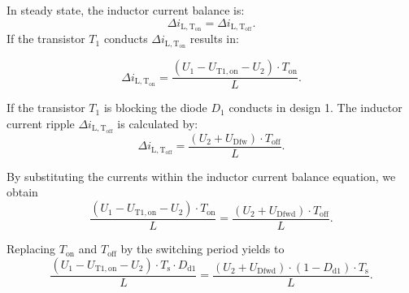 

\begin{solutionblock}
	In steady state, the inductor current balance is:
	\begin{equation*}
		\Delta i_\mathrm{L,T_\mathrm{on}} =\Delta i_\mathrm{L,T_\mathrm{off}} .
	\end{equation*}
	If the transistor $T_\mathrm{1}$ conducts $\Delta i_\mathrm{L,T_\mathrm{on}}$ results in:

	\begin{equation*}
		\Delta i_\mathrm{L,T_\mathrm{on}}=\frac{(U_\mathrm{1}-U_\mathrm{T1,on}-U_\mathrm{2}) \cdot T_\mathrm{on} }{L}.
	\end{equation*}

	If the transistor $T_\mathrm{1}$ is blocking the diode $D_\mathrm{1}$ conducts in design 1.
	The inductor current ripple $\Delta i_\mathrm{L,T_\mathrm{off}}$ is calculated by:
	\begin{equation*}
		\Delta i_\mathrm{L,T_\mathrm{off}}=\frac{(U_\mathrm{2}+U_\mathrm{Dfw}) \cdot T_\mathrm{off}}{L}.
	\end{equation*}

	By substituting the currents within the inductor current balance equation, we obtain
	\begin{equation*}
		\frac{(U_\mathrm{1}-U_\mathrm{T1,on}-U_\mathrm{2}) \cdot T_\mathrm{on}}{L}=\frac{(U_\mathrm{2}+U_\mathrm{Dfwd}) \cdot T_\mathrm{off}}{L}.
	\end{equation*}

	Replacing $T_\mathrm{on}$ and $T_\mathrm{off}$ by the switching period yields to
	\begin{equation*}
		\frac{(U_\mathrm{1}-U_\mathrm{T1,on}-U_\mathrm{2}) \cdot T_\mathrm{s} \cdot D_\mathrm{d1}}{L} =
		\frac{(U_\mathrm{2}+U_\mathrm{Dfwd}) \cdot (1-D_\mathrm{d1}) \cdot T_\mathrm{s}}{L}.
	\end{equation*}


\end{solutionblock}

